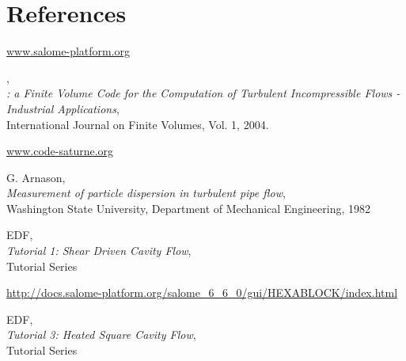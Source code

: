 \section{References}

\begin{thebibliography}{20}

 \textcolor{blue}{\underline{\url{www.salome-platform.org}}}

,\\
{\em \CS: a Finite Volume Code for the Computation of Turbulent
Incompressible Flows - Industrial Applications},\\
International Journal on Finite
Volumes, Vol. 1, 2004.

 \textcolor{blue}{\underline{\url{www.code-saturne.org}}}

 {\sc G. Arnason,}\\
{\em Measurement of particle dispersion in turbulent pipe flow},\\
Washington State University, Department of Mechanical Engineering, 1982

 {\sc EDF},\\
{\em Tutorial 1: Shear Driven Cavity Flow},\\
\CS Tutorial Series

 \textcolor{blue}{\underline{\url{http://docs.salome-platform.org/salome_6_6_0/gui/HEXABLOCK/index.html}}}

 {\sc EDF},\\
{\em Tutorial 3: Heated Square Cavity Flow},\\
\CS Tutorial Series

\end{thebibliography}
